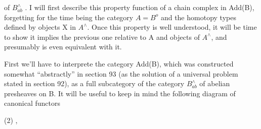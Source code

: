 
of $B^{\wedge}_{ab}$ . I will first describe this property   function of a chain
complex in Add(B), forgetting for the time being the category $A=B^{o}$
and the homotopy types defined by objects X in $A^{\wedge}$. Once this property
is well understood, it will be time to show it implies the previous
one relative to A and objects of $A^{\wedge}$, and presumably is even equivalent
with it.

First we'll have to interprete the category Add(B), which was
constructed somewhat ``abstractly'' in section 93 (as the solution of a
universal problem stated in section 92), as a full subcategory of
the category $B^{\wedge}_{ab}$ of abelian presheaves on B. It will be useful to
keep in mind the following diagram of canonical functors

(2)  ,


